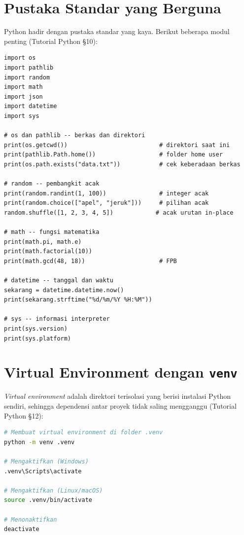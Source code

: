 \documentclass[../main.tex]{subfiles}
\begin{document}
\section{Pustaka Standar yang Berguna}

Python hadir dengan pustaka standar yang kaya. Berikut beberapa modul penting (Tutorial Python §10):

\begin{lstlisting}[caption=Contoh modul pustaka standar]
import os
import pathlib
import random
import math
import json
import datetime
import sys

# os dan pathlib -- berkas dan direktori
print(os.getcwd())                          # direktori saat ini
print(pathlib.Path.home())                  # folder home user
print(os.path.exists("data.txt"))           # cek keberadaan berkas

# random -- pembangkit acak
print(random.randint(1, 100))               # integer acak
print(random.choice(["apel", "jeruk"]))     # pilihan acak
random.shuffle([1, 2, 3, 4, 5])            # acak urutan in-place

# math -- fungsi matematika
print(math.pi, math.e)
print(math.factorial(10))
print(math.gcd(48, 18))                     # FPB

# datetime -- tanggal dan waktu
sekarang = datetime.datetime.now()
print(sekarang.strftime("%d/%m/%Y %H:%M"))

# sys -- informasi interpreter
print(sys.version)
print(sys.platform)
\end{lstlisting}

\section{Virtual Environment dengan \texttt{venv}}

\textit{Virtual environment} adalah direktori terisolasi yang berisi instalasi Python sendiri, sehingga dependensi antar proyek tidak saling mengganggu (Tutorial Python §12):

\begin{lstlisting}[language=bash,caption=Membuat dan mengaktifkan virtual environment]
# Membuat virtual environment di folder .venv
python -m venv .venv

# Mengaktifkan (Windows)
.venv\Scripts\activate

# Mengaktifkan (Linux/macOS)
source .venv/bin/activate

# Menonaktifkan
deactivate
\end{lstlisting}
\end{document}
